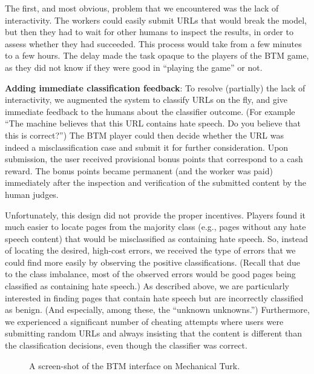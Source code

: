 The first, and most obvious, problem that we encountered was the lack of interactivity.  The workers could easily submit URLs that would break the model, but then they had to wait for other humans to inspect the results, in order to assess whether they had succeeded. This process would take from a few minutes to a few hours. The delay made the task opaque to the players of the BTM game,
as they did not know if they were good in ``playing the game'' or not.

\textbf{Adding immediate classification feedback}: To resolve (partially) the lack of interactivity, we augmented the system to classify URLs on the fly, and give immediate feedback to the humans about the classifier outcome. (For example ``The machine believes that this URL contains hate speech.  Do you believe that this is correct?'') The BTM player could then decide whether the URL was indeed a misclassification case and submit it for further consideration. Upon submission, the user received provisional bonus points that correspond to a cash reward. The bonus points became permanent (and the worker was paid) immediately after the inspection and verification of the submitted content by the human judges.
  

Unfortunately, this design did not provide the proper incentives. Players found it much easier to locate pages from the majority class (e.g., pages without any hate speech content) that would be misclassified as containing hate speech. So, instead of locating the desired, high-cost errors, we received the type of errors that we could find more easily by observing the positive classifications.  (Recall that due to the class imbalance, most of the observed errors would be good pages being classified as containing hate speech.) As described above, we are particularly interested in finding pages that contain hate speech but are incorrectly classified as benign.  (And especially, among these, the ``unknown unknowns.'') Furthermore, we experienced a significant number of cheating attempts where users were submitting random URLs and always insisting that the content is different than the classification decisions, even though the classifier was correct.

\begin{figure}[t]
\caption{A screen-shot of the BTM interface on Mechanical Turk.}
\label{fig:btm}
\end{figure}

